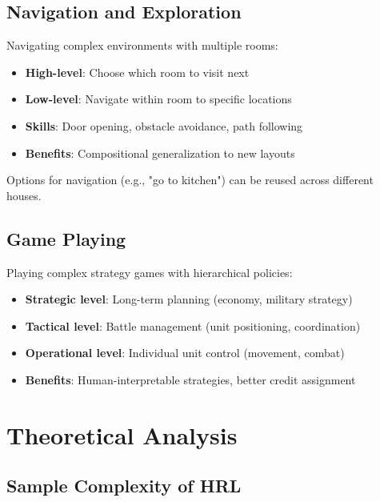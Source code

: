 \subsection{Navigation and Exploration}

\begin{examplebox}
Navigating complex environments with multiple rooms:
\begin{itemize}
    \item \textbf{High-level}: Choose which room to visit next
    \item \textbf{Low-level}: Navigate within room to specific locations
    \item \textbf{Skills}: Door opening, obstacle avoidance, path following
    \item \textbf{Benefits}: Compositional generalization to new layouts
\end{itemize}

Options for navigation (e.g., "go to kitchen") can be reused across different houses.
\end{examplebox}

\subsection{Game Playing}

\begin{examplebox}
Playing complex strategy games with hierarchical policies:
\begin{itemize}
    \item \textbf{Strategic level}: Long-term planning (economy, military strategy)
    \item \textbf{Tactical level}: Battle management (unit positioning, coordination)
    \item \textbf{Operational level}: Individual unit control (movement, combat)
    \item \textbf{Benefits}: Human-interpretable strategies, better credit assignment
\end{itemize}
\end{examplebox}

\section{Theoretical Analysis}

\subsection{Sample Complexity of HRL}

